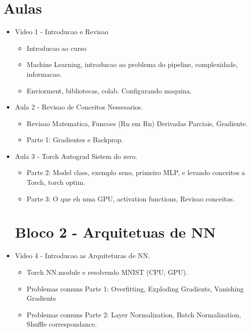 \documentclass[a4paper,12pt, brazil]{article}
\begin{document}
    \section*{Aulas}
    \begin{itemize}
        \section*{Bloco 1 - IA do Zero}
        \item Video 1 - Introducao e Revisao
        \begin{itemize}
            \item Introducao ao curso
            \item Machine Learning, introducao ao problema do pipeline, complexidade, informacao. 
            \item Enviorment, bibliotecas, colab. Configurando maquina.
        \end{itemize}
    
        \item Aula 2 - Revisao de Conceitos Nessesarios.
        \begin{itemize}
            \item Revisao Matematica, Funcoes (Rn em Rn) Derivadas Parciais, Gradiente. 
            \item Parte 1: Gradientes e Backprop. 
        \end{itemize}
            
        \item Aula 3 - Torch Autograd Sistem do zero.
            \begin{itemize}
                \item Parte 2: Model class, exemplo seno, primeiro MLP, e levando conceitos a Torch, torch optim. 
                \item Parte 3: O que eh uma GPU, activation functions, Revisao conceitos. 
            \end{itemize} 
        
        
        \section*{Bloco 2 - Arquitetuas de NN}
        \item Video 4 - Introducao as Arquiteturas de NN.
        \begin{itemize}
            \item Torch NN.module e resolvendo MNIST (CPU, GPU). 
            \item Problemas comuns Parte 1: Overfitting, Exploding Gradients, Vanishing Gradients
            \item Problemas comuns Parte 2: Layer Normalization, Batch Normalization, Shuffle correspondance.
        \end{itemize}
        

\end{itemize}
\end{document}
